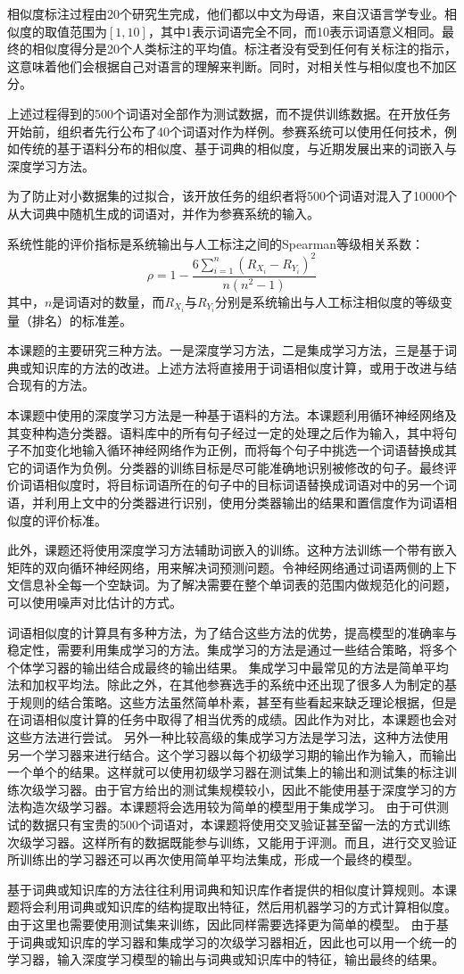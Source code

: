 相似度标注过程由20个研究生完成，他们都以中文为母语，来自汉语言学专业。相似度的取值范围为$[1, 10]$，其中1表示词语完全不同，而10表示词语意义相同。最终的相似度得分是20个人类标注的平均值。标注者没有受到任何有关标注的指示，这意味着他们会根据自己对语言的理解来判断。同时，对相关性与相似度也不加区分。

上述过程得到的500个词语对全部作为测试数据，而不提供训练数据。在开放任务开始前，组织者先行公布了40个词语对作为样例。参赛系统可以使用任何技术，例如传统的基于语料分布的相似度、基于词典的相似度，与近期发展出来的词嵌入与深度学习方法。

为了防止对小数据集的过拟合，该开放任务的组织者将500个词语对混入了10000个从大词典中随机生成的词语对，并作为参赛系统的输入。

系统性能的评价指标是系统输出与人工标注之间的Spearman等级相关系数：
\begin{equation}
\rho = 1 - \frac{6 \sum_{i = 1}^{n}(R_{X_i} - R_{Y_i})^2}{n(n^2 - 1)}
\end{equation}
其中，$n$是词语对的数量，而$R_{X_i}$与$R_{Y_i}$分别是系统输出与人工标注相似度的等级变量（排名）的标准差。

本课题的主要研究三种方法。一是深度学习方法，二是集成学习方法，三是基于词典或知识库的方法的改进。上述方法将直接用于词语相似度计算，或用于改进与结合现有的方法。

本课题中使用的深度学习方法是一种基于语料的方法。本课题利用循环神经网络及其变种构造分类器。语料库中的所有句子经过一定的处理之后作为输入，其中将句子不加变化地输入循环神经网络作为正例，而将每个句子中挑选一个词语替换成其它的词语作为负例。分类器的训练目标是尽可能准确地识别被修改的句子。最终评价词语相似度时，将目标词语所在的句子中的目标词语替换成词语对中的另一个词语，并利用上文中的分类器进行识别，使用分类器输出的结果和置信度作为词语相似度的评价标准。

此外，课题还将使用深度学习方法辅助词嵌入的训练。这种方法训练一个带有嵌入矩阵的双向循环神经网络，用来解决词预测问题。令神经网络通过词语两侧的上下文信息补全每一个空缺词。为了解决需要在整个单词表的范围内做规范化的问题，可以使用噪声对比估计的方式。

词语相似度的计算具有多种方法，为了结合这些方法的优势，提高模型的准确率与稳定性，需要利用集成学习的方法。集成学习的方法是通过一些结合策略，将多个个体学习器的输出结合成最终的输出结果。
集成学习中最常见的方法是简单平均法和加权平均法。除此之外，在其他参赛选手的系统中还出现了很多人为制定的基于规则的结合策略。这些方法虽然简单朴素，甚至有些看起来缺乏理论根据，但是在词语相似度计算的任务中取得了相当优秀的成绩。因此作为对比，本课题也会对这些方法进行尝试。
另外一种比较高级的集成学习方法是学习法，这种方法使用另一个学习器来进行结合。这个学习器以每个初级学习期的输出作为输入，而输出一个单个的结果。这样就可以使用初级学习器在测试集上的输出和测试集的标注训练次级学习器。由于官方给出的测试集规模较小，因此不能使用基于深度学习的方法构造次级学习器。本课题将会选用较为简单的模型用于集成学习。
由于可供测试的数据只有宝贵的500个词语对，本课题将使用交叉验证甚至留一法的方式训练次级学习器。这样所有的数据既能参与训练，又能用于评测。而且，进行交叉验证所训练出的学习器还可以再次使用简单平均法集成，形成一个最终的模型。

基于词典或知识库的方法往往利用词典和知识库作者提供的相似度计算规则。本课题将会利用词典或知识库的结构提取出特征，然后用机器学习的方式计算相似度。由于这里也需要使用测试集来训练，因此同样需要选择更为简单的模型。
由于基于词典或知识库的学习器和集成学习的次级学习器相近，因此也可以用一个统一的学习器，输入深度学习模型的输出与词典或知识库中的特征，输出最终的结果。
